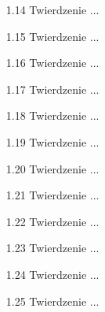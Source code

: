 \begin{enumerate}
    \item [1.14] Twierdzenie ... %
    \item [1.15] Twierdzenie ... %
    \item [1.16] Twierdzenie ... %
    \item [1.17] Twierdzenie ... %
    \item [1.18] Twierdzenie ... %
    \item [1.19] Twierdzenie ... %
    \item [1.20] Twierdzenie ... %
    \item [1.21] Twierdzenie ... %
    \item [1.22] Twierdzenie ... %
    \item [1.23] Twierdzenie ... %
    \item [1.24] Twierdzenie ... %
    \item [1.25] Twierdzenie ... %

\end{enumerate}
